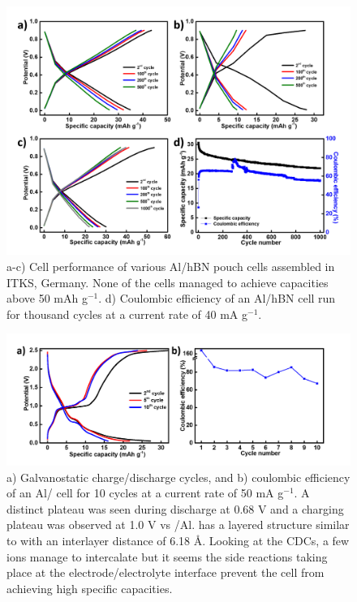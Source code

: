 \begin{figure}[tbh!]
\centering
\includegraphics[width=\textwidth]{Figures/appendix/pouchcellCDCCE}
\caption{a-c) Cell performance of various Al/hBN pouch cells assembled in ITKS, Germany. None of the cells managed to achieve capacities above 50 mAh g$^{-1}$. d) Coulombic efficiency of an Al/hBN cell run for thousand cycles at a current rate of 40 mA g$^{-1}$. }
\label{Figures/appendix:pouchcellCDCCE}
\end{figure}
\begin{figure}[tbh!]
\centering
\includegraphics[width=\textwidth]{Figures/appendix/WS2CDCCE}
\caption{ a) Galvanostatic charge/discharge cycles, and b) coulombic efficiency of an Al/ cell for 10 cycles at a current rate of 50 mA g$^{-1}$. A distinct plateau was seen during discharge at 0.68 V and a charging plateau was observed at 1.0 V vs /Al.  has a layered structure similar to  with an interlayer distance of 6.18 \AA. Looking at the CDCs, a few  ions manage to intercalate but it seems the side reactions taking place at the electrode/electrolyte interface prevent the cell from achieving high specific capacities.}
\label{Figures/appendix:WS2CDCCE}
\end{figure}